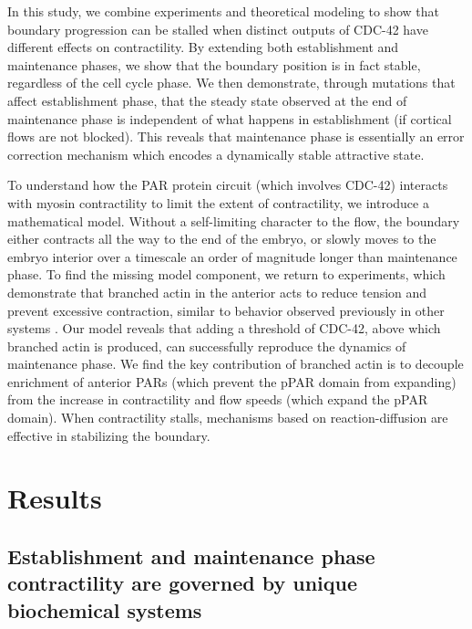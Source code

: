 \documentclass[11pt]{article}
\newcommand{\6}[1]{#1_{\text{6}}}
\newcommand{\3}[1]{#1_{\text{3}}}
\begin{document}
In this study, we combine experiments and theoretical modeling to show that boundary progression can be stalled when distinct outputs of CDC-42 have different effects on contractility. By extending both establishment and maintenance phases, we show that the boundary position is in fact stable, regardless of the cell cycle phase. We then demonstrate, through mutations that affect establishment phase, that the steady state observed at the end of maintenance phase is independent of what happens in establishment (if cortical flows are not blocked). This reveals that maintenance phase is essentially an error correction mechanism which encodes a dynamically stable attractive state. 

To understand how the PAR protein circuit (which involves CDC-42) interacts with myosin contractility to limit the extent of contractility, we introduce a mathematical model. Without a self-limiting character to the flow, the boundary either contracts all the way to the end of the embryo, or slowly moves to the embryo interior over a timescale an order of magnitude longer than maintenance phase. To find the missing model component, we return to experiments, which demonstrate that branched actin in the anterior acts to reduce tension and prevent excessive contraction, similar to behavior observed previously in other systems \citep{muresan2022f, yang2012arp2}. Our model reveals that adding a threshold of CDC-42, above which branched actin is produced, can successfully reproduce the dynamics of maintenance phase. We find the key contribution of branched actin is to decouple enrichment of anterior PARs (which prevent the pPAR domain from expanding) from the increase in contractility and
flow speeds (which expand the pPAR domain). When contractility stalls, mechanisms based on reaction-diffusion \citep{mori2008wave,goehring2011polarization} are effective in stabilizing the boundary.

\section*{Results}

\subsection*{Establishment and maintenance phase contractility are governed by unique biochemical systems}
\end{document}
